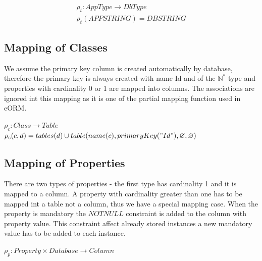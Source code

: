 \documentclass[11pt]{article}
\begin{document}
\begin{equation*}
\begin{gathered}
	\rho_{t} : AppType \rightarrow DbType  \\
 	\rho_{t}(APPSTRING) = DBSTRING 
\end{gathered}
\end{equation*}

\subsection{Mapping of Classes}
We assume the primary key column is created automatically by database, therefore the primary key is always created with name Id and of the $\mathbb{N^{*}}$ type and properties with cardinality 0 or 1 are mapped into columns. The associations are ignored int this mapping as it is one of the partial mapping function used in eORM.

\begin{center}
$\rho_{c}: Class \rightarrow Table $ \\ 
$\rho_{c}(c,d) = tables(d) \cup table(name(c), primaryKey("Id"), \varnothing, \varnothing) $
\end{center}

\subsection{Mapping of Properties}
There are two types of properties - the first type has cardinality 1  and it is mapped to a column. A property with cardinality greater than one has to be mapped int a table not a column, thus we have a special mapping case. When the property is mandatory the $NOTNULL$ constraint is added to the column with property value. This constraint affect already stored instances a new mandatory value has to be added to each instance.

$
\rho_p : Property \times Database \rightarrow Column 
$
\end{document}

